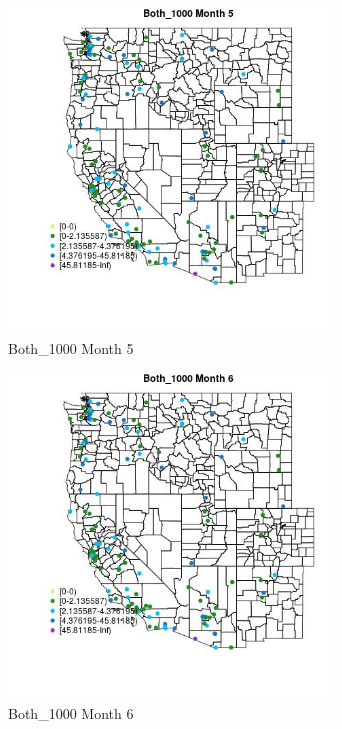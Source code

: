 \begin{figure} 
\centering  
\includegraphics[width=0.77\textwidth]{Code_Outputs/Report_ML_input_PM25_Step4_part_e_de_duplicated_aves_MapObsMo5Both_1000.jpg} 
\caption{\label{fig:Report_ML_input_PM25_Step4_part_e_de_duplicated_avesMapObsMo5Both_1000}Both_1000 Month 5} 
\end{figure} 
 

\clearpage 

\begin{figure} 
\centering  
\includegraphics[width=0.77\textwidth]{Code_Outputs/Report_ML_input_PM25_Step4_part_e_de_duplicated_aves_MapObsMo6Both_1000.jpg} 
\caption{\label{fig:Report_ML_input_PM25_Step4_part_e_de_duplicated_avesMapObsMo6Both_1000}Both_1000 Month 6} 
\end{figure} 
 

